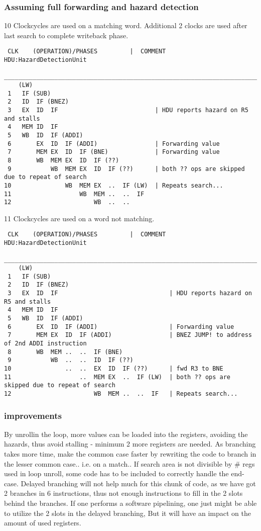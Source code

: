 \documentclass[a4paper,10pt]{article}
\begin{document}
\newpage

\subsubsection{Assuming full forwarding and hazard detection}

10 Clockcycles are used on a matching word. Additional 2 clocks are used after last search to complete writeback phase.
\begin{verbatim}
 CLK    (OPERATION)/PHASES         |  COMMENT   HDU:HazardDetectionUnit
 ________________________________________________________________________________________________
    (LW)  
 1   IF (SUB)
 2   ID  IF (BNEZ) 
 3   EX  ID  IF                           | HDU reports hazard on R5 and stalls
 4   MEM ID  IF     
 5   WB  ID  IF (ADDI)
 6       EX  ID  IF (ADDI)                | Forwarding value
 7       MEM EX  ID  IF (BNE)             | Forwarding value
 8       WB  MEM EX  ID  IF (??)
 9           WB  MEM EX  ID  IF (??)      | both ?? ops are skipped due to repeat of search
10               WB  MEM EX  ..  IF (LW)  | Repeats search...
11                   WB  MEM ..  ..  IF    
12                       WB  ..  ..
\end{verbatim}


11 Clockcycles are used on a word not matching.
\begin{verbatim}
 CLK    (OPERATION)/PHASES         |  COMMENT   HDU:HazardDetectionUnit
 ________________________________________________________________________________________________
    (LW)  
 1   IF (SUB)
 2   ID  IF (BNEZ) 
 3   EX  ID  IF                               | HDU reports hazard on R5 and stalls
 4   MEM ID  IF     
 5   WB  ID  IF (ADDI)                    
 6       EX  ID  IF (ADDI)                    | Forwarding value
 7       MEM EX  ID  IF (ADDI)                | BNEZ JUMP! to address of 2nd ADDI instruction
 8       WB  MEM ..  ..  IF (BNE)
 9           WB  ..  ..  ID  IF (??)      
10               ..  ..  EX  ID  IF (??)      | fwd R3 to BNE
11                   ..  MEM EX  ..  IF (LW)  | both ?? ops are skipped due to repeat of search
12                       WB  MEM ..  ..  IF   | Repeats search...
\end{verbatim}

\subsubsection{improvements}
By unrollin the loop, more values can be loaded into the registers, avoiding the hazards, thus avoid stalling - minimum 2 more registers are needed.
As branching takes more time, make the common case faster by rewriting the code to branch in the lesser common case.. i.e. on a match..
If search area is not divisible by \# regs used in loop unroll, some code has to be included to correctly handle the end-case.
Delayed branching will not help much for this chunk of code, as we have got 2 branches in 6 instructions, thus not enough instructions to fill in the 2 slots behind the branches.
If one performs a software pipelining, one just might be able to utilize the 2 slots in the delayed branching, But it will have an impact on the amount of used registers.
\end{document}
